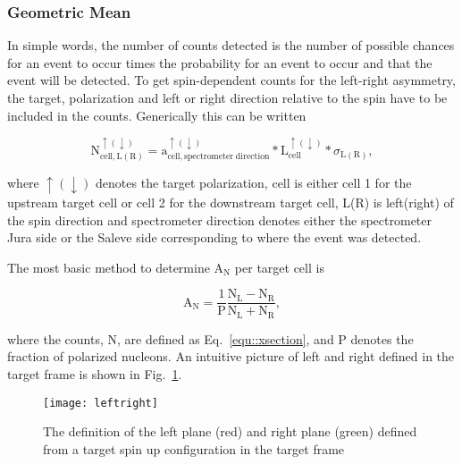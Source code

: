 \subsubsection{Geometric Mean} \label{sec::GeoMean}
In simple words, the number of
counts detected is the number of possible chances for an event to occur times
the probability for an event to occur and that the event will be detected.  To
get spin-dependent counts for the left-right asymmetry, the target, polarization
and left or right direction relative to the spin have to be included in the
counts.  Generically this can be written

\begin{equation}
  \label{equ::indexedCount}
  \mathrm{N}^{\uparrow(\downarrow)}_{\mathrm{cell},\mathrm{L(R)}} =
  \mathrm{a}^{\uparrow(\downarrow)}_{\mathrm{cell},\mathrm{spectrometer \;
      direction}} * \mathrm{L}^{\uparrow(\downarrow)}_{\mathrm{cell}} *
  \sigma_{\mathrm{L(R)}},
\end{equation}

\noindent
where $\uparrow(\downarrow)$ denotes the target polarization, cell is either
cell 1 for the upstream target cell or cell 2 for the downstream target cell,
L(R) is left(right) of the spin direction and spectrometer direction denotes
either the spectrometer Jura side or the Saleve side corresponding to where the
event was detected. \par

The most basic method to determine A$_{\mathrm{N}}$ per target cell is

\begin{equation}
  \label{equ::simpleAN}
  \mathrm{A}_{\mathrm{N}} = \frac{1}{\mathrm{P}}
  \frac{\mathrm{N}_{\mathrm{L}} -
    \mathrm{N}_{\mathrm{R}}}{\mathrm{N}_{\mathrm{L}} + \mathrm{N}_{\mathrm{R}}},
\end{equation}

\noindent
where the counts, N, are defined as Eq.~\ref{equ::xsection}, and P denotes the
fraction of polarized nucleons.  An intuitive picture of left and right defined
in the target frame is shown in Fig.~\ref{fig::leftright}.

\begin{figure}[h!t]
  \centering
  \texttt{[image: leftright]}
  \caption{The definition of the left plane (red) and right plane (green)
    defined from a target spin up configuration in the target frame}
  \label{fig::leftright}
\end{figure}

